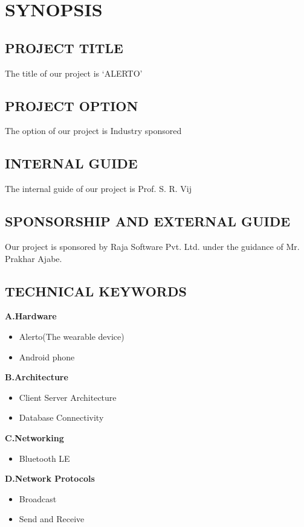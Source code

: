 \documentclass[12pt,a4paper]{report}
\begin{document}
\chapter{\bf{SYNOPSIS}}
\pagestyle{fancy}
\renewcommand{\footrulewidth}{0.3pt}

\newpage
\section{PROJECT TITLE}
The title of our project is `ALERTO'

\section{PROJECT OPTION}
The option of our project is Industry sponsored

\section{INTERNAL GUIDE}
The internal guide of our project is  Prof. S. R. Vij

\section{SPONSORSHIP AND EXTERNAL GUIDE}
Our project is sponsored by Raja Software Pvt. Ltd. under the guidance of Mr. Prakhar Ajabe.

\section{TECHNICAL KEYWORDS}
\textbf{A.Hardware}
\begin{itemize}
	\item Alerto(The wearable device)
	\item Android phone
\end{itemize}
\textbf{B.Architecture}
\begin{itemize}
	\item Client Server Architecture
	\item Database Connectivity
\end{itemize}
\textbf{C.Networking}
\begin{itemize}
	\item Bluetooth LE
\end{itemize}
\textbf{D.Network Protocols}
\begin{itemize}
	\item Broadcast 
	\item Send and Receive
\end{itemize}
\end{document}
